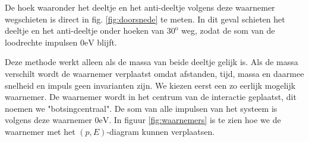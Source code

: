 De hoek waaronder het deeltje en het anti-deeltje volgens deze waarnemer wegschieten is direct in fig. \ref{fig:doorsnede} te meten. In dit geval schieten het deeltje en het anti-deeltje onder hoeken van $30^{\mathrm{o}}$ weg, zodat de som van de loodrechte impulsen $0\mathrm{eV}$ blijft. 

Deze methode werkt alleen als de massa van beide deeltje gelijk is. Als de massa verschilt wordt de waarnemer verplaatst omdat afstanden, tijd, massa en daarmee snelheid en impuls geen invarianten zijn. We kiezen eerst een zo eerlijk mogelijk waarnemer. De waarnemer wordt in het centrum van de interactie geplaatst, dit noemen we "botsingcentraal". De som van alle impulsen van het systeem is volgens deze waarnemer $0\mathrm{eV}$. In figuur \ref{fig:waarnemers} is te zien hoe we de waarnemer met het $(p,E)$-diagram kunnen verplaatsen.

